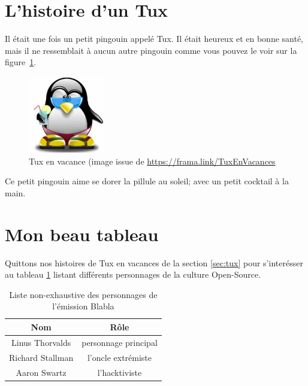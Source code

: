 \documentclass[a4paper, 12pt]{article}
\begin{document}
\section{L'histoire d'un Tux \label{sec:tux}}
Il était une fois un petit pingouin appelé Tux.  Il était heureux et en bonne santé, mais il ne ressemblait à aucun autre pingouin comme vous pouvez le voir sur la figure~\ref{fig:tux}.
\begin{figure}
\centering
\includegraphics[width=0.3\textwidth]{tux.jpeg}
\caption{Tux en vacance (image issue de \url{https://frama.link/TuxEnVacances}}
\label{fig:tux}
\end{figure}
Ce petit pingouin aime se dorer la pillule au soleil; avec un petit cocktail à la main.

\section{Mon beau tableau}
Quittons nos histoires de Tux en vacances de la section \ref{sec:tux} pour s'interésser au tableau \ref{tab:Linux} listant différents personnages de la culture Open-Source.
\begin{table}
\centering
\begin{tabular}{|c||c|}
\hline
Nom & Rôle \\
\hline
\hline
Linus Thorvalds & personnage principal \\
\hline
Richard Stallman & l'oncle extrémiste \\
\hline
Aaron Swartz & l'hacktiviste \\
\hline
\end{tabular}
\caption{Liste non-exhaustive des personnages de l'émission Blabla}
\label{tab:Linux}
\end{table}
\end{document}
